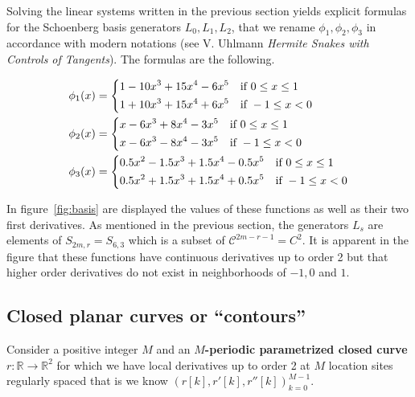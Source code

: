 \documentclass[a4paper, 11pt]{article}
\begin{document}
Solving the linear systems written in the previous section yields explicit formulas for the Schoenberg basis generators 
$L_0, L_1, L_2$, that we rename $\phi_1, \phi_2, \phi_3$ in accordance with modern notations (see V. Uhlmann 
\emph{Hermite Snakes with Controls of Tangents}). The formulas are the following. 

\begin{align}
  \phi_1(x) &= \begin{dcases} 
    1 - 10 x^3 + 15 x^4 - 6 x^5 & \text{if } 0 \leq x \leq 1  \\
    1 + 10 x^3 + 15 x^4 + 6 x^5 & \text{if } -1 \leq x < 0 \\
  \end{dcases} \\
  \phi_2(x) &= \begin{dcases}
    x - 6 x^3 + 8 x^4 - 3 x^5 & \text{if } 0 \leq x \leq 1  \\
    x - 6 x^3 - 8 x^4 - 3 x^5 & \text{if } -1 \leq x < 0 \\
  \end{dcases} \\
  \phi_3(x) &= \begin{dcases}
    0.5 x^2 - 1.5 x^3 + 1.5 x^4 - 0.5 x^5 & \text{if } 0 \leq x \leq 1  \\
    0.5 x^2 + 1.5 x^3 + 1.5 x^4 + 0.5 x^5 & \text{if } -1 \leq x < 0 \\
  \end{dcases}
\end{align}

In figure~\ref{fig:basis} are displayed the values of these functions as well as their two first derivatives. As 
mentioned in the previous section, the generators $L_s$ are elements of $S_{2m, r}=S_{6,3}$ which is a subset of 
$\mathcal{C}^{2m-r-1} = C^{2}$. It is apparent in the figure that these functions have continuous derivatives up to 
order 2 but that higher order derivatives do not exist in neighborhoods of $-1, 0$ and $1$.

\subsection{Closed planar curves or “contours”}

Consider a positive integer $M$ and an \textbf{$M$-periodic parametrized closed curve} $r: \mathbb{R} \to \mathbb{R}^2$ 
for which we have local derivatives up to order 2 at $M$ location sites regularly spaced that is we know ${(r[k], r'[k], 
r''[k])}_{k=0}^{M-1}$. 
\end{document}
